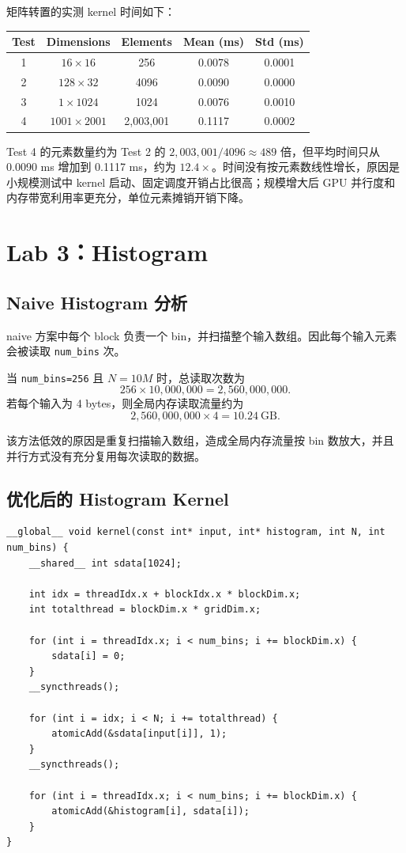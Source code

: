 \documentclass[UTF8,a4paper,12pt,fontset=none]{ctexart}
\begin{document}
矩阵转置的实测 kernel 时间如下：

\begin{center}
\begin{tabular}{ccccc}
\toprule
Test & Dimensions & Elements & Mean (ms) & Std (ms) \\
\midrule
1 & $16\times16$     & 256       & 0.0078 & 0.0001 \\
2 & $128\times32$    & 4096      & 0.0090 & 0.0000 \\
3 & $1\times1024$    & 1024      & 0.0076 & 0.0010 \\
4 & $1001\times2001$ & 2,003,001 & 0.1117 & 0.0002 \\
\bottomrule
\end{tabular}
\end{center}

Test 4 的元素数量约为 Test 2 的 $2,003,001/4096\approx489$ 倍，但平均时间只从 0.0090 ms 增加到 0.1117 ms，约为 $12.4\times$。时间没有按元素数线性增长，原因是小规模测试中 kernel 启动、固定调度开销占比很高；规模增大后 GPU 并行度和内存带宽利用率更充分，单位元素摊销开销下降。

\section{Lab 3：Histogram}

\subsection{Naive Histogram 分析}

naive 方案中每个 block 负责一个 bin，并扫描整个输入数组。因此每个输入元素会被读取 \texttt{num\_bins} 次。

当 \texttt{num\_bins=256} 且 $N=10M$ 时，总读取次数为
\[
  256\times10,000,000=2,560,000,000.
\]
若每个输入为 4 bytes，则全局内存读取流量约为
\[
  2,560,000,000\times4=10.24\ \text{GB}.
\]

该方法低效的原因是重复扫描输入数组，造成全局内存流量按 bin 数放大，并且并行方式没有充分复用每次读取的数据。

\subsection{优化后的 Histogram Kernel}

\begin{lstlisting}
__global__ void kernel(const int* input, int* histogram, int N, int num_bins) {
    __shared__ int sdata[1024];

    int idx = threadIdx.x + blockIdx.x * blockDim.x;
    int totalthread = blockDim.x * gridDim.x;

    for (int i = threadIdx.x; i < num_bins; i += blockDim.x) {
        sdata[i] = 0;
    }
    __syncthreads();

    for (int i = idx; i < N; i += totalthread) {
        atomicAdd(&sdata[input[i]], 1);
    }
    __syncthreads();

    for (int i = threadIdx.x; i < num_bins; i += blockDim.x) {
        atomicAdd(&histogram[i], sdata[i]);
    }
}
\end{lstlisting}
\end{document}
